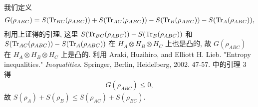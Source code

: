 \documentclass{assignment}
\begin{document}
\begin{pf}
    我们定义
    \begin{align}
        G(\rho_{ABC})=S(\operatorname{Tr}_{BC}(\rho_{ABC}))+S(\operatorname{Tr}_{AC}(\rho_{ABC}))-S(\operatorname{Tr}_B(\rho_{ABC}))-S(\operatorname{Tr}_A(\rho_{ABC})),
    \end{align}
    利用上证得的引理, 这里 $S(\operatorname{Tr}_{BC}(\rho_{ABC}))-S(\operatorname{Tr}_B(\rho_{ABC}))$ 和 $S(\operatorname{Tr}_{AC}(\rho_{ABC}))-S(\operatorname{Tr}_A(\rho_{ABC}))$ 在 $H_A\otimes H_B\otimes H_C$ 上也是凸的, 故 $G(\rho_{ABC})$ 在 $H_A\otimes H_B\otimes H_C$ 上是凸的.
    利用 Araki, Huzihiro, and Elliott H. Lieb. "Entropy inequalities." \textit{Inequalities}. Springer, Berlin, Heidelberg, 2002. 47-57. 中的引理 3 得
    \begin{align}
        G(\rho_{ABC})\leq 0,
    \end{align}
    故 $S(\rho_A)+S(\rho_B)\leq S(\rho_{AC})+S(\rho_{BC})$.
\end{pf}
\end{document}
